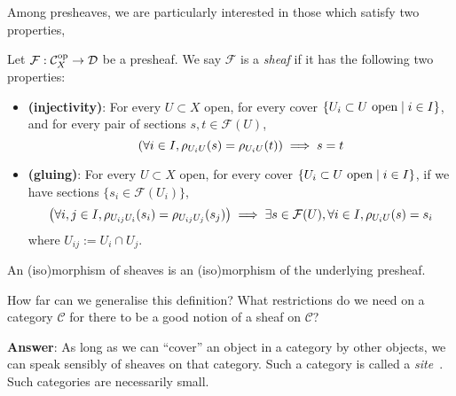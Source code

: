 \documentclass[000-main.tex]{subfiles}
\begin{document}
Among presheaves, we are particularly interested in those which satisfy two properties,
\begin{definition}
  Let $\mathcal{F}: \mathcal{C}_X^{\text{op}}\to \mathcal{D}$ be a presheaf.
  We say $\mathcal{F}$ is a \emph{sheaf} if it has the following two properties:
  \begin{itemize}
    \item \textbf{(injectivity)}: For every $U\subset X$ open, for every cover $\{U_i\subset U\text{ open} \mid i\in I\}$, and for every pair of sections $s, t\in \mathcal{F}(U)$,
          \begin{displaymath}
            \qty(\forall i\in I, \rho_{U_i U}(s) = \rho_{U_i U}(t)) \implies s = t
          \end{displaymath}
    \item \textbf{(gluing)}: For every $U\subset X$ open, for every cover $\{U_i\subset U\text{ open}\mid i\in I\}$, if we have sections $\{s_i\in \mathcal{F}(U_i)\}$,
          \begin{displaymath}
            \qty(\forall i, j \in I, \rho_{U_{ij} U_i}(s_i) = \rho_{U_{ij} U_j}(s_j)) \implies \exists s\in \mathcal{F}(U), \forall i\in I, \rho_{U_i U}(s) = s_i
          \end{displaymath}
          where $U_{ij} := U_i\cap U_j$.
  \end{itemize}

  An (iso)morphism of sheaves is an (iso)morphism of the underlying presheaf.
\end{definition}
\begin{remark}
  How far can we generalise this definition?
  What restrictions do we need on a category $\mathcal{C}$ for there to be a good notion of a sheaf on $\mathcal{C}$?
\end{remark}

\textbf{Answer}: As long as we can ``cover'' an object in a category by other objects, we can speak sensibly of sheaves on that category.
Such a category is called a \emph{site}~\cite[\href{https://stacks.math.columbia.edu/tag/00VG}{Tag 00VG}]{stacksprojectauthorsStacksProject2023}.
Such categories are necessarily small.
\end{document}
